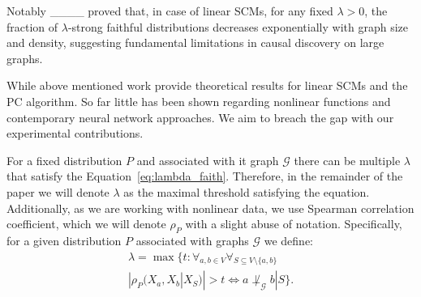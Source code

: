 
Notably ____ proved that, in case of linear SCMs, for any fixed $\lambda > 0$, the fraction of $\lambda$-strong faithful distributions decreases exponentially with graph size and density, suggesting fundamental limitations in causal discovery on large graphs.  

While above mentioned work provide theoretical results for linear SCMs and the PC algorithm. So far little has been shown regarding nonlinear functions and contemporary neural network approaches. We aim to breach the gap with our experimental contributions.

For a fixed distribution $P$ and associated with it graph $\mathcal{G}$ there can be multiple $\lambda$ that satisfy the Equation~\ref{eq:lambda_faith}. Therefore, in the remainder of the paper we will denote $\lambda$ as the maximal threshold satisfying the equation. Additionally, as we are working with nonlinear data, we use Spearman correlation coefficient, which we will denote $\rho_P$ with a slight abuse of notation. Specifically, for a given distribution $P$ associated with graphs $\mathcal{G}$ we define:
\begin{multline}\label{eq:lambda_def}
    \lambda = \max\{t: \forall_{a,b \in V} \forall_{S \subseteq V \setminus \{a ,b\}} \\ |\rho_P(X_a, X_b | X_S)| > t \iff a \not\perp_\mathcal{G} b | S\}.
\end{multline}



